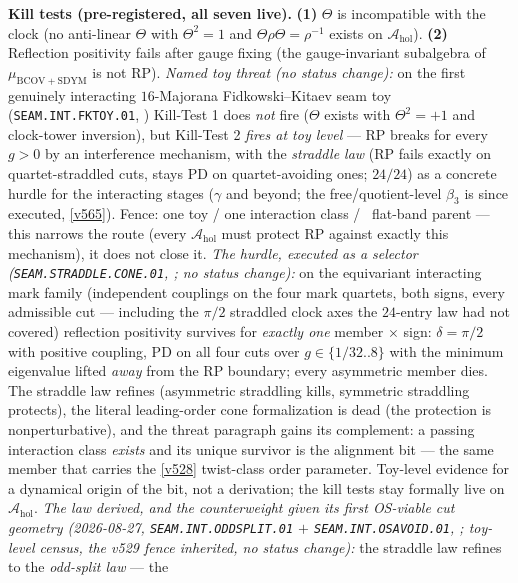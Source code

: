 \par\smallskip\noindent\textbf{Kill tests (pre-registered, all seven live).}
\textbf{(1)} $\Theta$ is incompatible with the clock (no anti-linear $\Theta$ with $\Theta^2=1$ and
$\Theta\rho\Theta=\rho^{-1}$ exists on $\mathcal A_{\mathrm{hol}}$).
\textbf{(2)} Reflection positivity fails after gauge fixing (the gauge-invariant subalgebra of
$\mu_{\mathrm{BCOV+SDYM}}$ is not RP).
\emph{Named toy threat (no status change):} on the first genuinely interacting $16$-Majorana
Fidkowski--Kitaev seam toy (\texttt{SEAM.INT.FKTOY.01}, )
Kill-Test 1 does \emph{not} fire ($\Theta$ exists with $\Theta^2=+1$ and clock-tower inversion),
but Kill-Test 2 \emph{fires at toy level} --- RP breaks for every $g>0$ by an interference
mechanism, with the \emph{straddle law} (RP fails exactly on quartet-straddled cuts, stays PD on
quartet-avoiding ones; $24/24$) as a concrete hurdle for the interacting stages ($\gamma$ and
beyond; the free/quotient-level $\beta_3$ is since executed, \vref{v565}). Fence: one toy / one
interaction class / \mC\ flat-band parent --- this narrows the route (every $\mathcal A_{\mathrm{hol}}$
must protect RP against exactly this mechanism), it does not close it.
\emph{The hurdle, executed as a selector (\texttt{SEAM.STRADDLE.CONE.01},
; no status change):} on the equivariant interacting mark
family (independent couplings on the four mark quartets, both signs, every admissible cut ---
including the $\pi/2$ straddled clock axes the $24$-entry law had not covered) reflection
positivity survives for \emph{exactly one} member $\times$ sign: $\delta=\pi/2$ with positive
coupling, PD on all four cuts over $g\in\{1/32..8\}$ with the minimum eigenvalue lifted
\emph{away} from the RP boundary; every asymmetric member dies. The straddle law refines
(asymmetric straddling kills, symmetric straddling protects), the literal leading-order cone
formalization is dead (the protection is nonperturbative), and the threat paragraph gains its
complement: a passing interaction class \emph{exists} and its unique survivor is the alignment
bit --- the same member that carries the \vref{v528} twist-class order parameter. Toy-level
evidence for a dynamical origin of the bit, not a derivation; the kill tests stay formally live
on $\mathcal A_{\mathrm{hol}}$.
\emph{The law derived, and the counterweight given its first OS-viable cut geometry
(2026-08-27, \texttt{SEAM.INT.ODDSPLIT.01} $+$ \texttt{SEAM.INT.OSAVOID.01},
; toy-level census, the v529 fence inherited, no
status change):} the straddle law refines to the \emph{odd-split law} --- the
